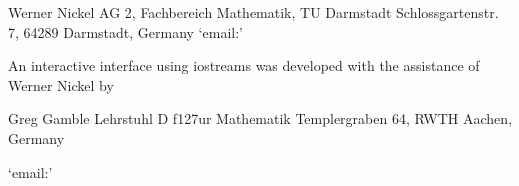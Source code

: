 \begintt
Werner Nickel
AG 2, Fachbereich Mathematik, TU Darmstadt
Schlossgartenstr. 7, 64289 Darmstadt, Germany
\endtt
{}`email:' 

An  interactive  interface  using  iostreams  was  developed   with   the
assistance of Werner Nickel by

{}Greg Gamble
Lehrstuhl D f\accent127ur Mathematik
Templergraben 64, RWTH Aachen, Germany

{}`email:' 


